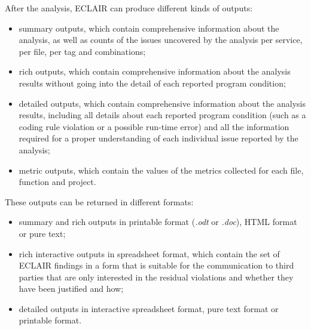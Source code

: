 After the analysis, ECLAIR can produce different kinds of outputs:
\begin{itemize}
  \item summary outputs, which contain comprehensive information about the analysis, as well as counts of the issues uncovered by the analysis per service, per file, per tag and combinations;
  \item rich outputs, which contain comprehensive information about the analysis results without going into the detail of each reported program condition;
  \item detailed outputs, which contain comprehensive information about the analysis results, including all details about each reported program condition (such as a coding rule violation or a possible run-time error) and all the information required for a proper understanding of each individual issue reported by the analysis;
  \item metric outputs, which contain the values of the metrics collected for each file, function and project.
\end{itemize}

These outputs can be returned in different formats:
\begin{itemize}
  \item summary and rich outputs in printable format (\emph{.odt} or \emph{.doc}), HTML format or pure text;
  \item rich interactive outputs in spreadsheet format, which contain the set of ECLAIR findings in a form that is suitable for the communication to third parties that are only interested in the residual violations and whether they have been justified and how;
  \item detailed outputs in interactive spreadsheet format, pure text format or printable format.
\end{itemize}

